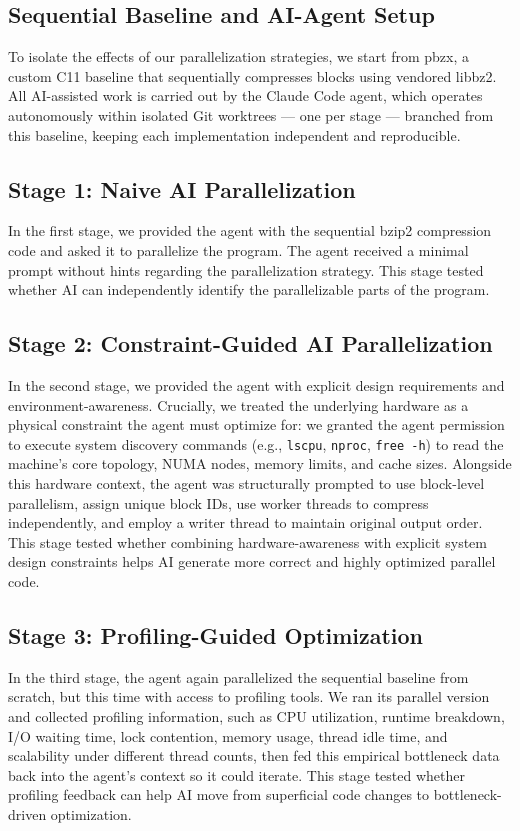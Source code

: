 \documentclass[conference]{IEEEtran}
\begin{document}
\subsection{Sequential Baseline and AI-Agent Setup}
To isolate the effects of our parallelization strategies, we start from pbzx, a custom C11 baseline that sequentially compresses blocks using vendored libbz2. All AI-assisted work is carried out by the Claude Code agent, which operates autonomously within isolated Git worktrees --- one per stage --- branched from this baseline, keeping each implementation independent and reproducible.

\subsection{Stage 1: Naive AI Parallelization}
In the first stage, we provided the agent with the sequential bzip2 compression code and asked it to parallelize the program. The agent received a minimal prompt without hints regarding the parallelization strategy. This stage tested whether AI can independently identify the parallelizable parts of the program.

\subsection{Stage 2: Constraint-Guided AI Parallelization}
In the second stage, we provided the agent with explicit design requirements and environment-awareness. Crucially, we treated the underlying hardware as a physical constraint the agent must optimize for: we granted the agent permission to execute system discovery commands (e.g., \texttt{lscpu}, \texttt{nproc}, \texttt{free -h}) to read the machine's core topology, NUMA nodes, memory limits, and cache sizes. Alongside this hardware context, the agent was structurally prompted to use block-level parallelism, assign unique block IDs, use worker threads to compress independently, and employ a writer thread to maintain original output order. This stage tested whether combining hardware-awareness with explicit system design constraints helps AI generate more correct and highly optimized parallel code.

\subsection{Stage 3: Profiling-Guided Optimization}
In the third stage, the agent again parallelized the sequential baseline from scratch, but this time with access to profiling tools. We ran its parallel version and collected profiling information, such as CPU utilization, runtime breakdown, I/O waiting time, lock contention, memory usage, thread idle time, and scalability under different thread counts, then fed this empirical bottleneck data back into the agent's context so it could iterate. This stage tested whether profiling feedback can help AI move from superficial code changes to bottleneck-driven optimization.
\end{document}
